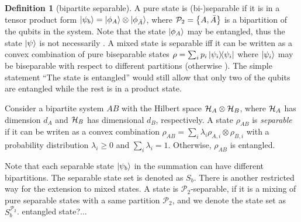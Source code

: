 \documentclass[
aps,
pra,
floatfix,
]{revtex4-2}
\theoremstyle{plain}
\theoremstyle{definition}
\newtheorem{definition}{Definition}
\newtheorem{example}{Example}
\newcommand{\ppartition}{\mathcal{P}}
\newcommand{\dm}{\rho}
\begin{document}
\begin{definition}[bipartite separable]\label{def:bipartite_separable}
	A pure state is (bi-)separable if it is in a tensor product form $\ket{\psi_b}=\ket{\phi_A}\otimes\ket{\phi_{\bar{A}}}$, 
	where $\ppartition_2 = \qty{ A, \bar{A} }$ is a bipartition of the qubits in the system.
	Note that the state $\ket{\phi_A}$ may be entangled, thus the state $\ket{\psi}$ is not necessarily .
	A mixed state is separable iff it can be written as a convex combination of pure biseparable states $\dm=\sum_i p_i \op{\psi_i}$ where $\ket{\psi_i}$ may be biseparable with respect to different partitions (otherwise ).
	The simple statement “The state is entangled” would still allow that only two of the qubits are entangled while the rest is in a product state.

	Consider a bipartite system $AB$ with the Hilbert space $\mathcal{H}_A \otimes \mathcal{H}_B$, where $\mathcal{H}_A$ has dimension $d_A$ and $\mathcal{H}_B$ has dimensional $d_B$, respectively.
	A state $\dm_{AB}$ is \emph{separable} if it can be writen as a convex combination $\dm_{AB}= \sum_i \lambda_i \dm_{A,i} \otimes \dm_{B,i}$ with a probability distribution $\lambda_i\ge 0$ and $\sum_i \lambda_i = 1$. Otherwise, $\dm_{AB}$ is entangled.

	Note that each separable state $\ket{\psi_b}$ in the summation can have different bipartitions.
	The separable state set is denoted as $S_b$.
	There is another restricted way for the extension to mixed states. 
	A state is $\ppartition_2$-separable, if it is a mixing of pure separable states with a same partition $\ppartition_2$, 
	and we denote the state set as $S_b^{\ppartition_2}$. 
	entangled state?...
\end{definition}
\end{document}
